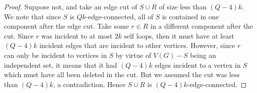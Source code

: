 \documentclass{article}
\begin{document}
\begin{proof}
    Suppose not, and take an edge cut of $S \cup R$ of size less than $(Q-4)k$. We note that since $S$ is $Qk$-edge-connected, all of $S$ is contained in one component after the edge cut. Take some $r \in R$ in a different component after the cut. Since $r$ was incident to at most $2k$ self loops, then it must have at least $(Q-4)k$ incident edges that are incident to other vertices. However, since $r$ can only be incident to vertices in $S$ by virtue of $V(G)-S$ being an independent set, it means that it had $(Q-4)k$ edges incident to a vertex in $S$ which must have all been deleted in the cut. But we assumed the cut was less than $(Q-4)k$, a contradiction. Hence $S \cup R$ is $(Q-4)k$-edge-connected. 




\end{proof}
\end{document}
